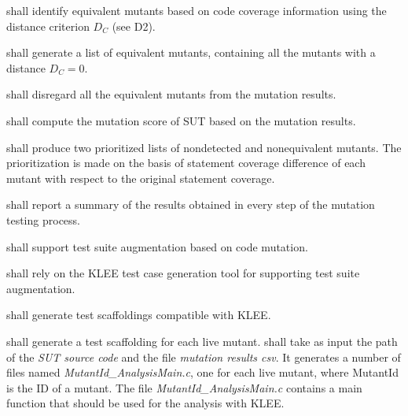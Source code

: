 \RQ{} \FAQAS shall identify equivalent mutants based on code coverage information using the distance criterion $D_C$ (see D2).


\RQ{} \FAQAS shall generate a list of equivalent mutants, containing all the mutants with a distance $D_C = 0$.

\RQ{} \FAQAS shall disregard all the equivalent mutants from the mutation results.


\RQ{} \FAQAS shall compute the mutation score of SUT based on the mutation results.

\RQ{} \FAQAS shall produce two prioritized lists of nondetected and nonequivalent mutants. The prioritization is made on the basis of statement coverage difference of each mutant with respect to the original statement coverage.

\RQ{} \FAQAS shall report a summary of the results obtained in every step of the mutation testing process.



\RQ{} \FAQAS shall support test suite augmentation based on code mutation.

\RQ{} \FAQAS shall rely on the KLEE test case generation tool for supporting test suite augmentation.

\RQ{} \FAQAS shall generate test scaffoldings compatible with KLEE.

\RQ{} \FAQAS shall generate a test scaffolding for each live mutant. \FAQAS shall take as input the path of the \emph{SUT source code} and the file \emph{mutation results csv}. It generates a number of files named \emph{MutantId\_AnalysisMain.c}, one for each live mutant, where MutantId is the ID of a mutant. The file \emph{MutantId\_AnalysisMain.c} contains a main function that should be used for the analysis with KLEE. 

